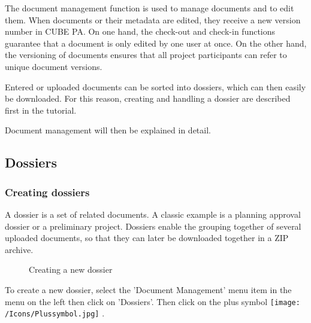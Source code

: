 \vspace{\baselineskip}

The document management function is used to manage documents and to edit them. When documents or their metadata are edited, they receive a new version number in CUBE PA. On one hand, the check-out and check-in functions guarantee that a document is only edited by one user at once. On the other hand, the versioning of documents ensures that all project participants can refer to unique document versions.

\vspace{1cm}  

Entered or uploaded documents can be sorted into dossiers, which can then easily be downloaded. For this reason, creating and handling a dossier are described first in the tutorial.

\vspace{\baselineskip}

Document management will then be explained in detail.

\subsection{Dossiers}
\label{bkm:Ref442544219}\subsubsection{Creating dossiers}

A dossier is a set of related documents. A classic example is a planning approval dossier or a preliminary project. Dossiers enable the grouping together of several uploaded documents, so that they can later be downloaded together in a ZIP archive.

\begin{figure}[H]
\caption{Creating a new dossier}
\end{figure}

To create a new dossier, select the 'Document Management' menu item in the menu on the left then click on 'Dossiers'. Then click on the plus symbol \texttt{[image: /Icons/Plussymbol.jpg]} .

